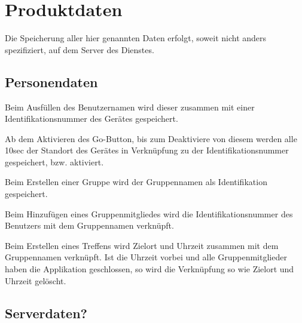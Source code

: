 \section{Produktdaten}

Die Speicherung aller hier genannten Daten erfolgt, soweit nicht anders spezifiziert, auf dem Server des Dienstes.

\subsection{Personendaten}
Beim Ausfüllen des Benutzernamen wird dieser zusammen mit einer Identifikationsnummer des Gerätes gespeichert.

Ab dem Aktivieren des Go-Button, bis zum Deaktiviere von diesem werden alle 10sec der Standort des Gerätes in Verknüpfung zu der Identifikationsnummer gespeichert, bzw. aktiviert.

Beim Erstellen einer Gruppe wird der Gruppennamen als Identifikation gespeichert.

Beim Hinzufügen eines Gruppenmitgliedes wird die Identifikationsnummer des Benutzers mit dem Gruppennamen verknüpft.

Beim Erstellen eines Treffens wird Zielort und Uhrzeit zusammen mit dem Gruppennamen verknüpft. Ist die Uhrzeit vorbei und alle Gruppenmitglieder haben die Applikation geschlossen, so wird die Verknüpfung so wie Zielort und Uhrzeit gelöscht.


\subsection{Serverdaten?}